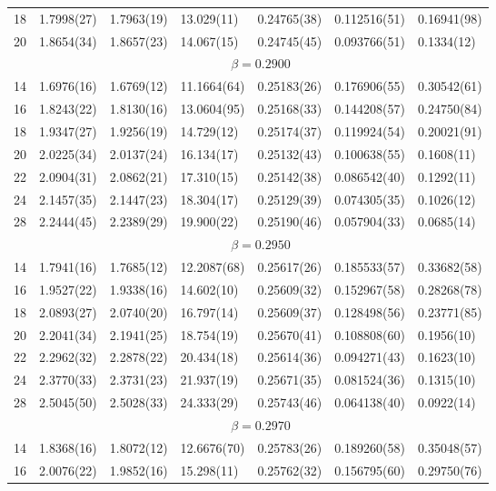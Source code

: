 \documentclass[12pt]{article}
\begin{document}
\begin{table}[t]
\begin{center}
{\begin{tabular}{|l|l|l|l|l|l|l|}
18 & 1.7998(27) & 1.7963(19) & 13.029(11) & 0.24765(38) & 0.112516(51) & 0.16941(98)\\ 
20 & 1.8654(34) & 1.8657(23) & 14.067(15) & 0.24745(45) & 0.093766(51) & 0.1334(12)\\ 
\hline 
  & \multicolumn{6}{|c|}{$ \beta = 0.2900 $} \\ 
 \hline 
14 & 1.6976(16) & 1.6769(12) & 11.1664(64) & 0.25183(26) & 0.176906(55) & 0.30542(61)\\ 
16 & 1.8243(22) & 1.8130(16) & 13.0604(95) & 0.25168(33) & 0.144208(57) & 0.24750(84)\\ 
18 & 1.9347(27) & 1.9256(19) & 14.729(12) & 0.25174(37) & 0.119924(54) & 0.20021(91)\\ 
20 & 2.0225(34) & 2.0137(24) & 16.134(17) & 0.25132(43) & 0.100638(55) & 0.1608(11)\\ 
22 & 2.0904(31) & 2.0862(21) & 17.310(15) & 0.25142(38) & 0.086542(40) & 0.1292(11)\\ 
24 & 2.1457(35) & 2.1447(23) & 18.304(17) & 0.25129(39) & 0.074305(35) & 0.1026(12)\\ 
28 & 2.2444(45) & 2.2389(29) & 19.900(22) & 0.25190(46) & 0.057904(33) & 0.0685(14)\\ 
\hline 
  & \multicolumn{6}{|c|}{$ \beta = 0.2950 $} \\ 
 \hline 
14 & 1.7941(16) & 1.7685(12) & 12.2087(68) & 0.25617(26) & 0.185533(57) & 0.33682(58)\\ 
16 & 1.9527(22) & 1.9338(16) & 14.602(10) & 0.25609(32) & 0.152967(58) & 0.28268(78)\\ 
18 & 2.0893(27) & 2.0740(20) & 16.797(14) & 0.25609(37) & 0.128498(56) & 0.23771(85)\\ 
20 & 2.2041(34) & 2.1941(25) & 18.754(19) & 0.25670(41) & 0.108808(60) & 0.1956(10)\\ 
22 & 2.2962(32) & 2.2878(22) & 20.434(18) & 0.25614(36) & 0.094271(43) & 0.1623(10)\\ 
24 & 2.3770(33) & 2.3731(23) & 21.937(19) & 0.25671(35) & 0.081524(36) & 0.1315(10)\\ 
28 & 2.5045(50) & 2.5028(33) & 24.333(29) & 0.25743(46) & 0.064138(40) & 0.0922(14)\\ 
\hline 
  & \multicolumn{6}{|c|}{$ \beta = 0.2970 $} \\ 
 \hline 
14 & 1.8368(16) & 1.8072(12) & 12.6676(70) & 0.25783(26) & 0.189260(58) & 0.35048(57)\\ 
16 & 2.0076(22) & 1.9852(16) & 15.298(11) & 0.25762(32) & 0.156795(60) & 0.29750(76)\\ 

\end{tabular}}
\end{center}
\end{table}
\end{document}
